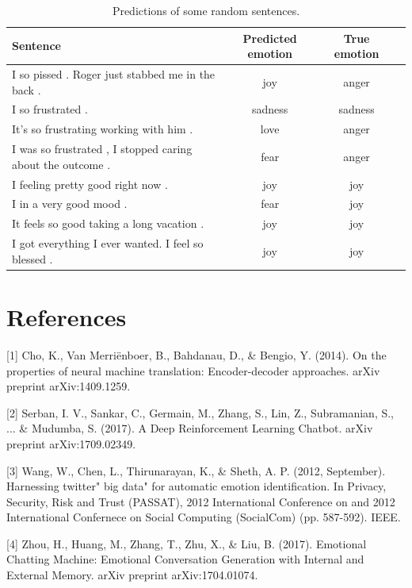 \documentclass{article}
\begin{document}
\begin{table}[tbp]
\centering  %
\begin{tabular}{lccc}  %
\hline
Sentence &Predicted emotion &True emotion\\ \hline  %
I so pissed . Roger just stabbed me in the back . &joy &anger \\         %
I so frustrated . &sadness &sadness \\        %
It's so frustrating working with him . &love &anger\\ 
I was so frustrated , I stopped caring about the outcome . &fear &anger \\
I feeling pretty good right now . &joy &joy \\
I in a very good mood . &fear &joy \\
It feels so good taking a long vacation . &joy &joy \\
I got everything I ever wanted. I feel so blessed . &joy &joy \\ \hline
\end{tabular}
\caption{Predictions of some random sentences.}
\label{sentence}
\end{table}




















\section*{References}

[1] Cho, K., Van Merriënboer, B., Bahdanau, D., \& Bengio, Y. (2014). On the properties of neural machine translation: Encoder-decoder approaches. arXiv preprint arXiv:1409.1259.


[2] Serban, I. V., Sankar, C., Germain, M., Zhang, S., Lin, Z., Subramanian, S., ... \& Mudumba, S. (2017). A Deep Reinforcement Learning Chatbot. arXiv preprint arXiv:1709.02349.

[3] Wang, W., Chen, L., Thirunarayan, K., \& Sheth, A. P. (2012, September). Harnessing twitter" big data" for automatic emotion identification. In Privacy, Security, Risk and Trust (PASSAT), 2012 International Conference on and 2012 International Confernece on Social Computing (SocialCom) (pp. 587-592). IEEE.

[4] Zhou, H., Huang, M., Zhang, T., Zhu, X., \& Liu, B. (2017). Emotional Chatting Machine: Emotional Conversation Generation with Internal and External Memory. arXiv preprint arXiv:1704.01074.
\end{document}
